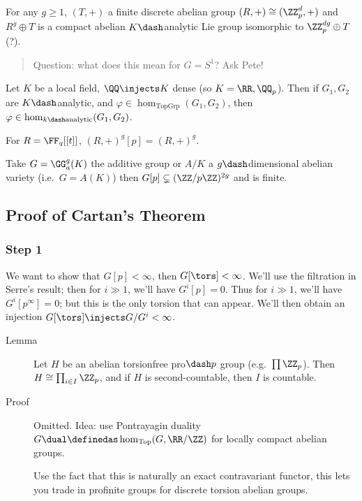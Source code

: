 For any \(g\geq 1\), \((T, +)\) a finite discrete abelian group
\((R, +) \cong (\ZZ_p^d, +)\) and \(R^g \oplus T\) is a compact abelian
\(K\dash\)analytic Lie group isomorphic to \(\ZZ_p^{dg} \oplus T\) (?).

\begin{quote}
Question: what does this mean for \(G = S^1\)? Ask Pete!
\end{quote}

\begin{description}
\tightlist
\item[Theorem (Cartan)]
Let \(K\) be a local field, \(\QQ\injects K\) dense (so
\(K = \RR, \QQ_p\)). Then if \(G_1, G_2\) are \(K\dash\)analytic, and
\(\varphi \in \hom_{\text{TopGrp}}(G_1, G_2)\), then
\(\varphi \in \hom_{k\dash\text{analytic}}(G_1, G_2)\).
\item[Example]
For \(R = \FF_q[[t]]\), \((R, +)^g [p] = (R, +)^g\).
\item[Example]
Take \(G = \GG_a^g(K)\) the additive group or \(A/K\) a
\(g\dash\)dimensional abelian variety (i.e.~\(G = A(K)\)) then
\(G[p] \subsetneq (\ZZ/p\ZZ)^{2g}\) and is finite.
\end{description}

\hypertarget{proof-of-cartans-theorem}{%
\subsection{Proof of Cartan's Theorem}\label{proof-of-cartans-theorem}}

\hypertarget{step-1-2}{%
\subsubsection{Step 1}\label{step-1-2}}

We want to show that \(G[p] < \infty\), then \(G[\tors] < \infty\).
We'll use the filtration in Serre's result; then for \(i \gg 1\), we'll
have \(G^i[p] = 0\). Thus for \(i \gg 1\), we'll have
\(G^i[p^\infty] = 0\); but this is the only torsion that can appear.
We'll then obtain an injection \(G[\tors] \injects G/G^i < \infty\).

\begin{description}
\item[Lemma]
Let \(H\) be an abelian torsionfree pro\(\dash p\) group
(e.g.~\(\prod \ZZ_p\)). Then \(H \cong \prod_{i\in I} \ZZ_p\), and if
\(H\) is second-countable, then \(I\) is countable.
\item[Proof]
Omitted. Idea: use Pontrayagin duality
\(G\dual \definedas \hom_{\text{Top}}(G, \RR/\ZZ)\) for locally compact
abelian groups.

\hfill\break

Use the fact that this is naturally an exact contravariant functor, this
lets you trade in profinite groups for discrete torsion abelian groups.
\end{description}

